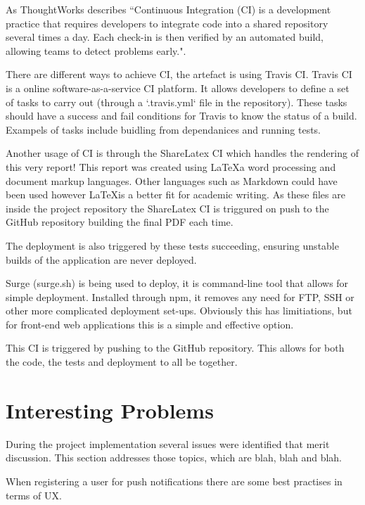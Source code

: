 As ThoughtWorks describes ``Continuous Integration (CI) is a development practice that requires developers to integrate code into a shared repository several times a day. Each check-in is then verified by an automated build, allowing teams to detect problems early.". %

There are different ways to achieve CI, the artefact is using Travis CI. Travis CI is a online software-as-a-service CI platform. It allows developers to define a set of tasks to carry out (through a `.travis.yml` file in the repository). These tasks should have a success and fail conditions for Travis to know the status of a build. Exampels of tasks include buidling from dependanices and running tests.

Another usage of CI is through the ShareLatex CI which handles the rendering of this very report! This report was created using \LaTeX a word processing and document markup languages. Other languages such as Markdown could have been used however \LaTeX is a better fit for academic writing. As these files are inside the project repository the ShareLatex CI is triggured on push to the GitHub repository building the final PDF each time.  %

The deployment is also triggered by these tests succeeding, ensuring unstable builds of the application are never deployed.

Surge (surge.sh) is being used to deploy, it is command-line tool that allows for simple deployment. Installed through npm, it removes any need for FTP, SSH or other more complicated deployment set-ups. Obviously this has limitiations, but for front-end web applications this is a simple and effective option. %

This CI is triggered by pushing to the GitHub repository. This allows for both the code, the tests and deployment to all be together.

\section{Interesting Problems} \label{s-i--interesting-problems}

During the project implementation several issues were identified that merit discussion. This section addresses those topics, which are blah, blah and blah.


When registering a user for push notifications there are some best practises in terms of UX.

